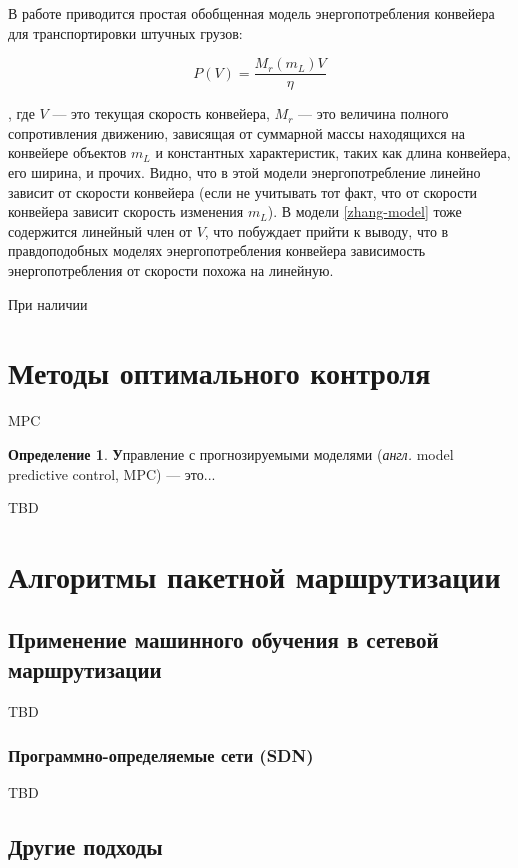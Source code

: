 \documentclass[specification,annotation,times]{itmo-student-thesis}
\theoremstyle{definition}
\newtheorem{definition-ru}{Определение}
\begin{document}
В работе \cite{halepoto2016design} приводится простая обобщенная модель
энергопотребления конвейера для транспортировки штучных грузов:

\begin{equation}\label{zhang-model}
  P(V) = \frac{M_r(m_L)V}{\eta}
\end{equation}

, где $V$ --- это текущая скорость конвейера, $M_r$ --- это величина полного
сопротивления движению, зависящая от суммарной массы находящихся на конвейере
объектов $m_L$ и константных характеристик, таких как длина конвейера, его
ширина, и прочих. Видно, что в этой модели энергопотребление линейно зависит от
скорости конвейера (если не учитывать тот факт, что от скорости конвейера
зависит скорость изменения $m_L$). В модели \ref{zhang-model} тоже содержится
линейный член от $V$, что побуждает прийти к выводу, что в правдоподобных
моделях энергопотребления конвейера зависимость энергопотребления от скорости
похожа на линейную.

При наличии 

\section{Методы оптимального контроля}

MPC \cite{luo2015energy}

\begin{definition-ru}
  \textbf Управление с прогнозируемыми моделями (\textit{англ.} model predictive
  control, MPC) --- это...
\end{definition-ru}

TBD

\section{Алгоритмы пакетной маршрутизации}

\subsection{Применение машинного обучения в сетевой маршрутизации}

TBD

\subsubsection{Программно-определяемые сети (SDN)}

TBD

\subsection{Другие подходы}
\end{document}
